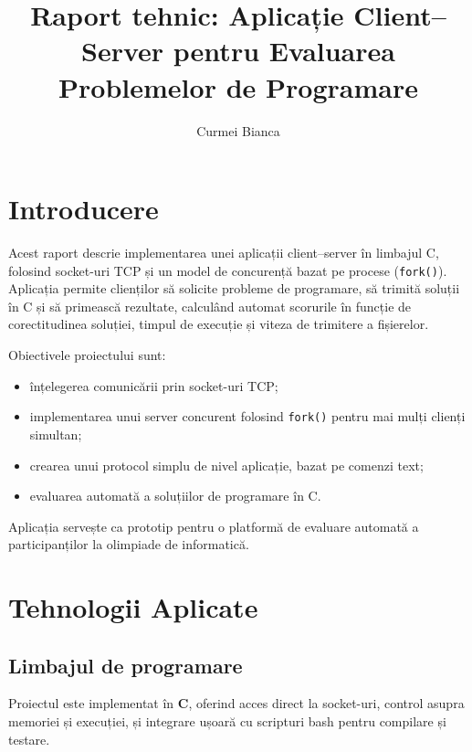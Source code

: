 \documentclass[runningheads]{llncs}
\title{Raport tehnic: Aplicație Client--Server pentru Evaluarea Problemelor de Programare}
\author{Curmei Bianca}
\institute{Facultatea de Informatică, Universitatea "Alexandru Ioan-Cuza" din Iași}
\begin{document}
\maketitle
\thispagestyle{plain}
\pagestyle{plain}

\section*{Introducere}

Acest raport descrie implementarea unei aplicații client--server în limbajul C, folosind socket-uri TCP și un model de concurență bazat pe procese (\texttt{fork()}). Aplicația permite clienților să solicite probleme de programare, să trimită soluții în C și să primească rezultate, calculând automat scorurile în funcție de corectitudinea soluției, timpul de execuție și viteza de trimitere a fișierelor.

\vspace{3mm}

Obiectivele proiectului sunt:
\begin{itemize}[noitemsep, topsep=0pt]
    \item înțelegerea comunicării prin socket-uri TCP;
    \item implementarea unui server concurent folosind \texttt{fork()} pentru mai mulți clienți simultan;
    \item crearea unui protocol simplu de nivel aplicație, bazat pe comenzi text;
    \item evaluarea automată a soluțiilor de programare în C.
\end{itemize}

\vspace{3mm}

Aplicația servește ca prototip pentru o platformă de evaluare automată a participanților la olimpiade de informatică.

\vspace{10mm}

\section{Tehnologii Aplicate}

\subsection{Limbajul de programare}
Proiectul este implementat în \textbf{C}, oferind acces direct la socket-uri, control asupra memoriei și execuției, și integrare ușoară cu scripturi bash pentru compilare și testare.
\end{document}
